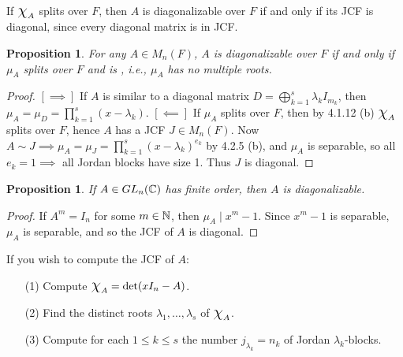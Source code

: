 \documentclass[11pt]{book}
\newcounter{counter}
\newtheorem{proposition}[counter]{Proposition}   \newtheorem{problem}[counter]{Problem}   \newtheorem*{proposition*}{Proposition}   \newtheorem*{lemma*}{Lemma}
\theoremstyle{definition}   \newtheorem{defn}[counter]{Definition} %
\newcommand{\Chi}{\mbox{\Large $\chi$}}
\newcommand{\vs}{\vspace{8pt}}   \newcommand{\hs}{\hspace{8pt}}
\numberwithin{counter}{chapter}
\begin{document}
\vs

\begin{remark}
If $\Chi_A$ splits over $F$, then $A$ is diagonalizable over $F$ if and only if its JCF is diagonal, since every diagonal matrix is in JCF.
\end{remark}

\vs

\begin{proposition}
For any $A \in M_n(F)$, $A$ is diagonalizable over $F$ if and only if $\mu_A$ splits over $F$ and is , i.e., $\mu_A$ has no multiple roots. 
\end{proposition}

\begin{proof}
$[\implies]$ If $A$ is similar to a diagonal matrix $D = \bigoplus_{k=1}^s \lambda_k I_{m_k}$, then $\mu_A = \mu_D = \prod_{k=1}^s (x-\lambda_k)$. $[\impliedby]$ If $\mu_A$ splits over $F$, then by 4.1.12 (b) $\Chi_A$ splits over $F$, hence $A$ has a JCF $J \in M_n(F)$. Now $A \sim J \implies \mu_A = \mu_J = \prod_{k=1}^s (x-\lambda_k)^{e_k}$ by 4.2.5 (b), and $\mu_A$ is separable, so all $e_k = 1 \implies$ all Jordan blocks have size 1. Thus $J$ is diagonal. 
\end{proof}

\vs

\begin{proposition}
If $A \in GL_n(\operatorname{\mathbb{C}})$ has finite order, then $A$ is diagonalizable.
\end{proposition}

\begin{proof}
If $A^m = I_n$ for some $m \in \operatorname{\mathbb{N}}$, then $\mu_A \mid x^m-1$. Since $x^m-1$ is separable, $\mu_A$ is separable, and so the JCF of $A$ is diagonal. 
\end{proof}

\vs

\begin{remark*}
If you wish to compute the JCF of $A$:
\begin{enumerate}
\item[(1)] Compute $\Chi_A = \det(xI_n - A)$.
\item[(2)] Find the distinct roots $\lambda_1,\dots,\lambda_s$ of $\Chi_A$.
\item[(3)] Compute for each $1 \leq k \leq s$ the number $j_{\lambda_k} = n_k$ of Jordan $\lambda_k$-blocks. 
\end{enumerate}
\end{remark*}

\vs
\end{document}
